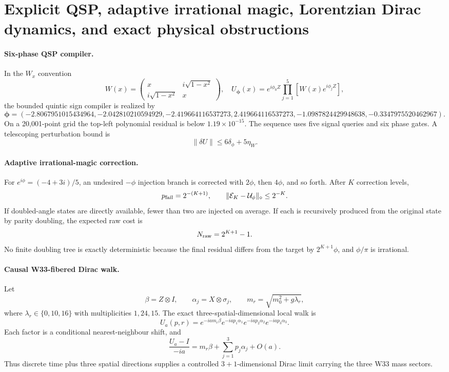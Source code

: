\section{Explicit QSP, adaptive irrational magic, Lorentzian Dirac dynamics, and exact physical obstructions}
\label{sec:bt4065-4072}

\paragraph{Six-phase QSP compiler.}
In the $W_x$ convention
\[
W(x)=\begin{pmatrix}x&i\sqrt{1-x^2}\\i\sqrt{1-x^2}&x\end{pmatrix},
\quad
U_{\boldsymbol\phi}(x)=e^{i\phi_0Z}\prod_{j=1}^{5}[W(x)e^{i\phi_jZ}],
\]
the bounded quintic sign compiler is realized by
\[
\boldsymbol\phi=(-2.8067951015434964,-2.042810210594929,-2.419664116537273,
2.419664116537273,-1.0987824429948638,-0.3347975520462967).
\]
On a 20,001-point grid the top-left polynomial residual is below
$1.19\times10^{-15}$.  The sequence uses five signal queries and six phase
gates.  A telescoping perturbation bound is
\[
\|\delta U\|\le6\delta_\phi+5\eta_W.
\]

\paragraph{Adaptive irrational-magic correction.}
For $e^{i\phi}=(-4+3i)/5$, an undesired $-\phi$ injection branch is corrected
with $2\phi$, then $4\phi$, and so forth.  After $K$ correction levels,
\[
p_{\rm fail}=2^{-(K+1)},
\qquad
\|\mathcal E_K-\mathcal U_\phi\|_\diamond\le2^{-K}.
\]
If doubled-angle states are directly available, fewer than two are injected on
average.  If each is recursively produced from the original state by parity
doubling, the expected raw cost is
\[
N_{\rm raw}=2^{K+1}-1.
\]
No finite doubling tree is exactly deterministic because the final residual
differs from the target by $2^{K+1}\phi$, and $\phi/\pi$ is irrational.

\paragraph{Causal W33-fibered Dirac walk.}
Let
\[
\beta=Z\otimes I,
\qquad
\alpha_j=X\otimes\sigma_j,
\qquad
m_r=\sqrt{m_0^2+g\lambda_r},
\]
where $\lambda_r\in\{0,10,16\}$ with multiplicities $1,24,15$.  The exact
three-spatial-dimensional local walk is
\[
U_a(p,r)=e^{-iam_r\beta}e^{-iap_1\alpha_1}e^{-iap_2\alpha_2}e^{-iap_3\alpha_3}.
\]
Each factor is a conditional nearest-neighbour shift, and
\[
\frac{U_a-I}{-ia}=m_r\beta+\sum_{j=1}^{3}p_j\alpha_j+O(a).
\]
Thus discrete time plus three spatial directions supplies a controlled
$3+1$-dimensional Dirac limit carrying the three W33 mass sectors.

